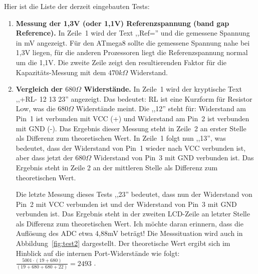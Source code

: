 \vspace{1cm}
Hier ist die Liste der derzeit eingebauten Tests:
\vspace{1cm}
\begin{enumerate}
\item {\bf Messung der 1,3V (oder 1,1V) Referenzspannung (band gap Reference).} In Zeile~1 wird der Text ,,Ref='' und die
gemessene Spannung in mV angezeigt.
F\"ur den ATmega8 sollte die gemessene Spannung nahe bei 1,3V liegen, f\"ur die anderen Prozessoren liegt
die Referenzspannung normal um die 1,1V.
Die zweite Zeile zeigt den resultierenden Faktor f\"ur die Kapazit\"ats-Messung mit dem \(470k\Omega\) Widerstand.
\item {\bf Vergleich der \(680\Omega\) Widerst\"ande.} 
In Zeile~1 wird der kryptische Text  ,,+RL- 12 13 23'' angezeigt. Das bedeutet:
RL ist eine Kurzform f\"ur Resistor Low, was die \(680\Omega\) Widerst\"ande meint. Die ,,12'' steht f\"ur: 
Widerstand am Pin~1 ist verbunden mit VCC (+) und Widerstand am Pin~2 ist verbunden mit GND (-). 
Das Ergebnis dieser Messung steht in Zeile~2 an erster Stelle als Differenz zum theoretischen Wert.
 In Zeile~1 folgt nun ,,13'', was bedeutet, dass der Widerstand von Pin~1 wieder nach VCC verbunden ist,
aber dass jetzt der \(680\Omega\) Widerstand von Pin~3  mit GND verbunden ist.
Das Ergebnis steht in Zeile 2 an der mittleren Stelle als Differenz zum theoretischen Wert.

Die letzte Messung dieses Tests ,,23'' bedeutet, dass nun der Widerstand von Pin~2 mit VCC verbunden ist und
der Widerstand von Pin~3 mit GND verbunden ist.
Das Ergebnis steht in der zweiten LCD-Zeile an letzter Stelle als Differenz zum theoretischen Wert.
Ich m\"ochte daran erinnern, dass die Aufl\"osung des ADC etwa 4,88mV betr\"agt!
Die Messsituation wird auch in Abbildung~\ref{fig:test2} dargestellt.
Der theoretische Wert ergibt sich im Hinblick auf die internen Port-Widerst\"ande wie folgt:
\(\frac{5001 \cdot  (19+680)}{ (19+680+680+22)} = 2493\) .


\end{enumerate}
